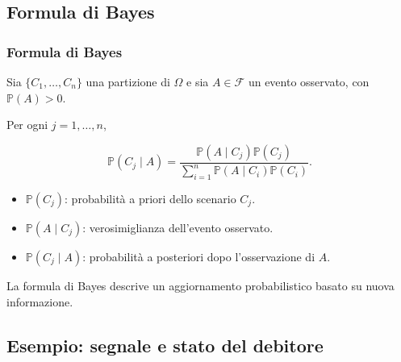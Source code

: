 \documentclass[handout]{beamer}%
\newenvironment{stepitemize}{\begin{itemize}[<+->]}{\end{itemize} }
\providecommand{\Prob}{\mathbb{P}}
\providecommand{\F}{\mathcal{F}}
\providecommand{\1}{\mathbf{1}}
\providecommand{\QTR}[2]{\csname #1\endcsname{#2}}
\begin{document}


\subsection{Formula di Bayes}%

\begin{frame}%
%

\frametitle{Formula di Bayes}%


Sia $\{C_{1},\ldots,C_{n}\}$ una partizione di $\Omega$ e sia $A\in\F$ un
evento osservato, con $\Prob(A)>0$.

\medskip

Per ogni $j=1,\ldots,n$,%

\[
\Prob(C_{j}\mid A) = \frac{\Prob(A\mid C_{j})\Prob(C_{j})} {\sum_{i=1}%
^{n}\Prob(A\mid C_{i})\Prob(C_{i})}.
\]


\medskip

\begin{stepitemize}
\item $\Prob(C_{j})$: probabilit\`{a} a priori dello scenario $C_{j}$.

\item $\Prob(A\mid C_{j})$: verosimiglianza dell'evento osservato.

\item $\Prob(C_{j}\mid A)$: probabilit\`{a} a posteriori dopo l'osservazione
di $A$.
\end{stepitemize}

\medskip

La formula di Bayes descrive un aggiornamento probabilistico basato su nuova informazione.%

\transboxout
\end{frame}%




\subsection{Esempio: segnale e stato del debitore}%
\end{document}
